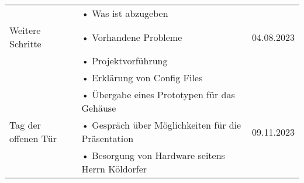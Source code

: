 \begin{table}[H]
\begin{tabular}{p{} | p{} | p{}}
 		\midrule
 			& •	Was ist abzugeben & \\
 		Weitere Schritte & • Vorhandene Probleme & 04.08.2023 \\
 			& •	Projektvorführung & \\
 			& •	Erklärung von Config Files & \\
 		\midrule
 			& •	Übergabe eines Prototypen für das Gehäuse & \\
 		Tag der offenen Tür & • Gespräch über Möglichkeiten für die Präsentation & 09.11.2023 \\
 			& •	Besorgung von Hardware seitens Herrn Köldorfer& \\
		\bottomrule
	\end{tabular}
\end{table}